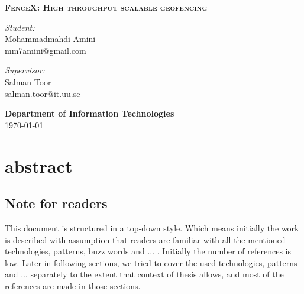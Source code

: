 \documentclass[a4]{report}
\begin{document}
\begin{titlepage}
        \noindent\makebox[\linewidth]{\rule{\linewidth}{1.2pt}}
        \textsc{ \textbf{\large FenceX: High throughput scalable geofencing }}
        \noindent\makebox[\linewidth]{\rule{\linewidth}{1.2pt}}

        \vspace{0.5in}

        \begin{minipage}{0.48\textwidth}
            \begin{flushleft}
                \textit{Student:} \\
                Mohammadmahdi Amini \\
                mm7amini@gmail.com
            \end{flushleft}
        \end{minipage}
        \begin{minipage}{0.48\textwidth}
            \begin{flushright}
                \textit{Supervisor:} \\
                Salman Toor \\
                salman.toor@it.uu.se
            \end{flushright}
        \end{minipage}

        \vspace{2in}

        \textbf{\large Department of Information Technologies} \\

        \today

    \end{titlepage}

    \newpage

    \setcounter{page}{2}
    \tableofcontents
    \newpage

    \listoffigures
    \newpage


    \section{abstract}

    \subsection{Note for readers}
    This document is structured in a top-down style.
    Which means initially the work is described with assumption that readers are familiar with all the mentioned
    technologies,  patterns, buzz words and ... .
    Initially the number of references is low.
    Later in following sections, we tried to cover the used technologies, patterns and ... separately to the extent
    that context of thesis allows, and most of the references are made in those sections.
\end{document}
